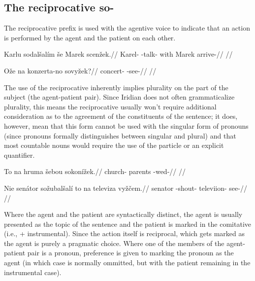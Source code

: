 \subsection{The reciprocative so-}
The reciprocative prefix  is used with the agentive voice to indicate that an action is performed by the agent and the patient on each other.

\pex
\begingl
\gla Karlu sodal\v{s}al\'im \v{s}e Marek scen\v{z}ek.//
\glb Karel- -talk- with Marek arrive-//
\glft {}//
\endgl
\xe

\pex
\begingl
\gla O\v{z}e na konzerta-no sovy\v{z}ek?//
\glb {}  concert- -see-//
\glft {}//
\endgl
\xe

The use of the reciprocative inherently implies plurality on the part of the subject (the agent-patient pair). Since Iridian does not often grammaticalize plurality, this means the reciprocative usually won't require additional consideration as to the agreement of the constituents of the sentence; it does, however, mean that this form cannot be used with the singular form of pronouns (since pronouns formally distinguishes between singular and plural) and that most countable nouns would require the use of the particle  or an explicit quantifier.

\pex
\begingl
\gla To na hruma \v{s}ebou sokon\'i\v{z}ek.//
\glb {}  church- parents -wed-//
\glft {}//
\endgl
\xe

\pex
\begingl
\gla Nie sen\'ator so\v{z}ubal\v{s}al\'i to na televiza vy\v{z}\v{c}em.//
\glb {} senator -shout-   televiion- see-//
\glft {}//
\endgl
\xe

Where the agent and the patient are syntactically distinct, the agent is usually presented as the topic of the sentence and the patient is marked in the comitative (i.e.,  + instrumental). Since the action itself is reciprocal, which gets marked as the agent is purely a pragmatic choice. Where one of the members of the agent-patient pair is a pronoun, preference is given to marking the pronoun as the agent (in which case  is normally ommitted, but with the patient remaining in the instrumental case).

